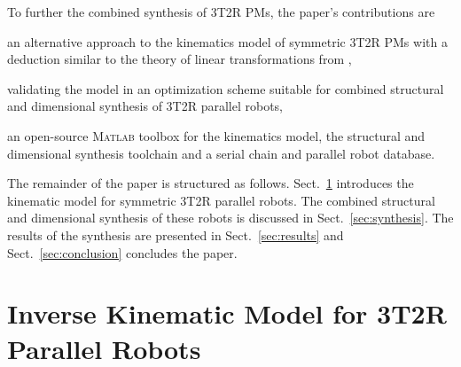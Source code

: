 \documentclass[
	graybox,
	vecphys] %
	{svmult}
\begin{document}
To further the combined synthesis of 3T2R PMs, the paper's contributions are
\begin{compactitem}
\item an alternative approach to the kinematics model of  symmetric 3T2R PMs with a deduction similar to the theory of linear transformations from \cite{Gogu2008},
\item validating the model in an optimization scheme suitable for combined structural and dimensional synthesis of 3T2R parallel robots,
\item an open-source \textsc{Matlab} toolbox for the kinematics model, the structural and dimensional synthesis toolchain and a serial chain and parallel robot database.
\end{compactitem}

The remainder of the paper is structured as follows. Sect.~\ref{sec:model} introduces the kinematic model for symmetric 3T2R parallel robots.
The combined structural and dimensional synthesis of these robots is discussed in Sect.~\ref{sec:synthesis}.
The results of the synthesis are presented in Sect.~\ref{sec:results} and Sect.~\ref{sec:conclusion} concludes the paper.



\section{Inverse Kinematic Model for 3T2R Parallel Robots}
\label{sec:model}


\end{document}
